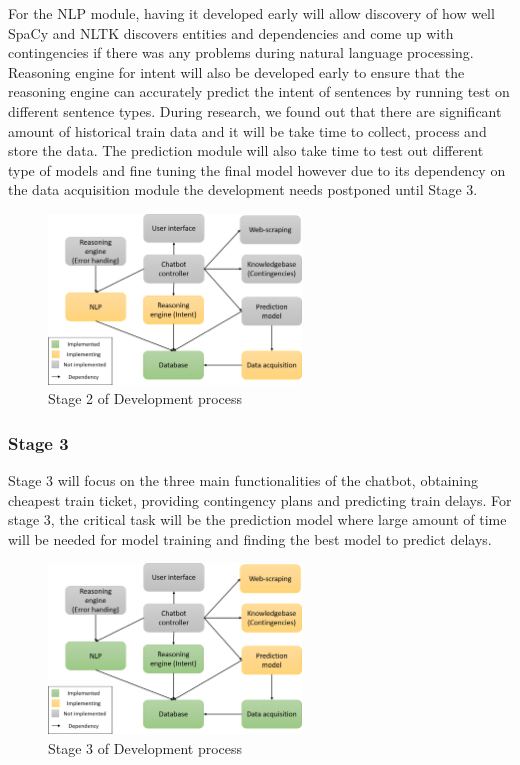 \documentclass[11pt]{article}
\begin{document}
For the NLP module, having it developed early will allow discovery of how well SpaCy and NLTK discovers entities and dependencies and come up with contingencies if there was any problems during natural language processing. Reasoning engine for intent will also be developed early to ensure that the reasoning engine can accurately predict the intent of sentences by running test on different sentence types. During research, we found out that there are significant amount of historical train data and it will be take time to collect, process and store the data. The prediction module will also take time to test out different type of models and fine tuning the final model however due to its dependency on the data acquisition module the development needs postponed until Stage 3.
\begin{figure}[!htb]
	\centering
	\includegraphics[width=0.6\textwidth]{Stage_2}
	\caption{Stage 2 of Development process }\label{fig:Stage 2}
\end{figure}


\subsubsection{Stage 3}
Stage 3 will focus on the three main functionalities of the chatbot, obtaining cheapest train ticket, providing contingency plans and predicting train delays. For stage 3, the critical task will be the prediction model where large amount of time will be needed for model training and finding the best model to predict delays.
\begin{figure}[!htb]
	\centering
	\includegraphics[width=0.6\textwidth]{Stage_3}
	\caption{Stage 3 of Development process }\label{fig:Stage 3}
\end{figure}
\end{document}

